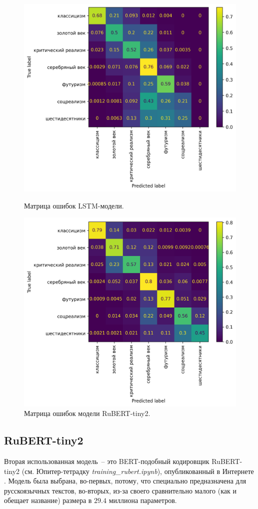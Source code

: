 \documentclass[a4paper,12pt]{article}
\begin{document}
\begin{figure}[tp]
    \centering
    \includegraphics[width=0.75\linewidth]{figures/lstm_confusion_matrix.png}
    \vspace{-0.3cm}
    \caption{Матрица ошибок LSTM-модели.}
    \label{fig:lstm_confusion}
    \vspace{0.5cm}
    \includegraphics[width=0.75\linewidth]{figures/rubert_confusion_matrix.png}
    \vspace{-0.3cm}
    \caption{Матрица ошибок модели RuBERT-tiny2.}
    \label{fig:rubert_confusion}
\end{figure}


\subsection{RuBERT-tiny2}

Вторая использованная модель~-- это BERT-подобный кодировщик RuBERT-tiny2 (см. Юпитер-тетрадку \textit{training\_rubert.ipynb}), опубликованный в Интернете \cite{rubert_model}. Модель была выбрана, во-первых, потому, что специально предназначена для русскоязычных текстов, во-вторых, из-за своего сравнительно малого (как и обещает название) размера в $29.4$ миллиона параметров.
\end{document}
